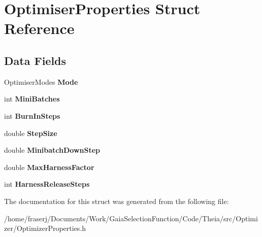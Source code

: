 \hypertarget{structOptimiserProperties}{}\section{Optimiser\+Properties Struct Reference}
\label{structOptimiserProperties}
\subsection*{Data Fields}
\begin{DoxyCompactItemize}
\item 
\mbox{\label{structOptimiserProperties_a95b49b57cd02916e840da511fa01e379}} 
Optimiser\+Modes {\bfseries Mode}
\item 
\mbox{\label{structOptimiserProperties_aacef8e01973bcece3214de56174778bb}} 
int {\bfseries Mini\+Batches}
\item 
\mbox{\label{structOptimiserProperties_a8d1a326eff70cb4d8472b334e95d8b07}} 
int {\bfseries Burn\+In\+Steps}
\item 
\mbox{\label{structOptimiserProperties_a8c385e907134c4491e8335bda1a51c1e}} 
double {\bfseries Step\+Size}
\item 
\mbox{\label{structOptimiserProperties_a7aa5f01db46d5aa68660babb57eb4068}} 
double {\bfseries Minibatch\+Down\+Step}
\item 
\mbox{\label{structOptimiserProperties_a6387c12bb01525748510c7e2dfed4339}} 
double {\bfseries Max\+Harness\+Factor}
\item 
\mbox{\label{structOptimiserProperties_a04b7f1577650e7a618a6dce076071123}} 
int {\bfseries Harness\+Release\+Steps}
\end{DoxyCompactItemize}


The documentation for this struct was generated from the following file\+:\begin{DoxyCompactItemize}
\item 
/home/fraserj/\+Documents/\+Work/\+Gaia\+Selection\+Function/\+Code/\+Theia/src/\+Optimizer/Optimizer\+Properties.\+h\end{DoxyCompactItemize}
